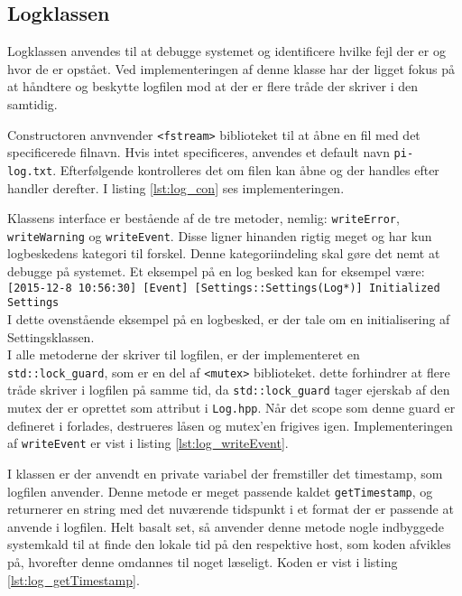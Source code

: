 \subsection{Logklassen}

Logklassen anvendes til at debugge systemet og identificere hvilke fejl der er og hvor de er opstået. Ved implementeringen af denne klasse har der ligget fokus på at håndtere og beskytte logfilen mod at der er flere tråde der skriver i den samtidig.

Constructoren anvnvender \texttt{<fstream>} biblioteket til at åbne en fil med det specificerede filnavn. Hvis intet specificeres, anvendes et default navn \texttt{pi-log.txt}. Efterfølgende kontrolleres det om filen kan åbne og der handles efter handler derefter. I listing \ref{lst:log_con} ses implementeringen.



Klassens interface er bestående af de tre metoder, nemlig: \texttt{writeError}, \texttt{writeWarning} og \texttt{writeEvent}. Disse ligner hinanden rigtig meget og har kun logbeskedens kategori til forskel. 
Denne kategoriindeling skal gøre det nemt at debugge på systemet. Et eksempel på en log besked kan for eksempel være:\\

\texttt{[2015-12-8 10:56:30] [Event] [Settings::Settings(Log*)] Initialized Settings}\\

I dette ovenstående eksempel på en logbesked, er der tale om en initialisering af Settingsklassen.\\
I alle metoderne der skriver til logfilen, er der implementeret en \texttt{std::lock\_guard}, som er en del af \texttt{<mutex>} biblioteket. dette forhindrer at flere tråde skriver i logfilen på samme tid, da \texttt{std::lock\_guard} tager ejerskab af den mutex der er oprettet som attribut i \texttt{Log.hpp}. Når det scope som denne guard er defineret i forlades, destrueres låsen og mutex'en frigives igen. Implementeringen af \texttt{writeEvent} er vist i listing \ref{lst:log_writeEvent}.



I klassen er der anvendt en private variabel der fremstiller det timestamp, som logfilen anvender. Denne metode er meget passende kaldet \texttt{getTimestamp}, og returnerer en string med det nuværende tidspunkt i et format der er passende at anvende i logfilen. Helt basalt set, så anvender denne metode nogle indbyggede systemkald til at finde den lokale tid på den respektive host, som koden afvikles på, hvorefter denne omdannes til noget læseligt. Koden er vist i listing \ref{lst:log_getTimestamp}.

